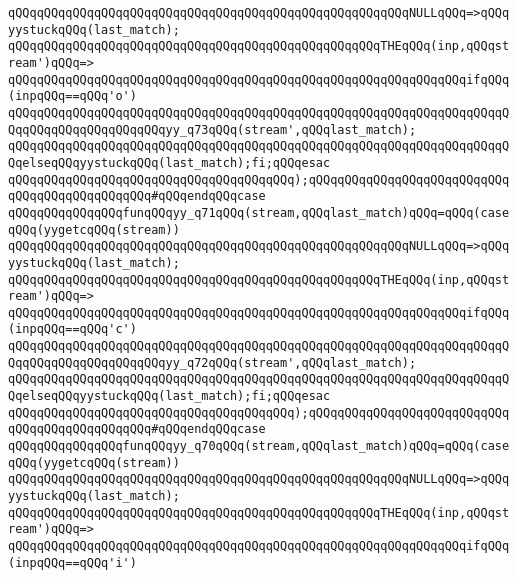 \verb|qQQqqQQqqQQqqQQqqQQqqQQqqQQqqQQqqQQqqQQqqQQqqQQqqQQqqQQqNULLqQQq=>qQQqyystuckqQQq(last_match);|\newline
\verb|qQQqqQQqqQQqqQQqqQQqqQQqqQQqqQQqqQQqqQQqqQQqqQQqqQQqTHEqQQq(inp,qQQqstream')qQQq=>|\newline
\verb|qQQqqQQqqQQqqQQqqQQqqQQqqQQqqQQqqQQqqQQqqQQqqQQqqQQqqQQqqQQqqQQqifqQQq(inpqQQq==qQQq'o')|\newline
\verb|qQQqqQQqqQQqqQQqqQQqqQQqqQQqqQQqqQQqqQQqqQQqqQQqqQQqqQQqqQQqqQQqqQQqqQQqqQQqqQQqqQQqqQQqqQQqyy_q73qQQq(stream',qQQqlast_match);|\newline
\verb|qQQqqQQqqQQqqQQqqQQqqQQqqQQqqQQqqQQqqQQqqQQqqQQqqQQqqQQqqQQqqQQqqQQqqQQqelseqQQqyystuckqQQq(last_match);fi;qQQqesac|\newline
\verb|qQQqqQQqqQQqqQQqqQQqqQQqqQQqqQQqqQQqqQQq);qQQqqQQqqQQqqQQqqQQqqQQqqQQqqQQqqQQqqQQqqQQqqQQq#qQQqendqQQqcase|\newline
\verb|qQQqqQQqqQQqqQQqfunqQQqyy_q71qQQq(stream,qQQqlast_match)qQQq=qQQq(caseqQQq(yygetcqQQq(stream))|\newline
\verb|qQQqqQQqqQQqqQQqqQQqqQQqqQQqqQQqqQQqqQQqqQQqqQQqqQQqqQQqNULLqQQq=>qQQqyystuckqQQq(last_match);|\newline
\verb|qQQqqQQqqQQqqQQqqQQqqQQqqQQqqQQqqQQqqQQqqQQqqQQqqQQqTHEqQQq(inp,qQQqstream')qQQq=>|\newline
\verb|qQQqqQQqqQQqqQQqqQQqqQQqqQQqqQQqqQQqqQQqqQQqqQQqqQQqqQQqqQQqqQQqifqQQq(inpqQQq==qQQq'c')|\newline
\verb|qQQqqQQqqQQqqQQqqQQqqQQqqQQqqQQqqQQqqQQqqQQqqQQqqQQqqQQqqQQqqQQqqQQqqQQqqQQqqQQqqQQqqQQqqQQqyy_q72qQQq(stream',qQQqlast_match);|\newline
\verb|qQQqqQQqqQQqqQQqqQQqqQQqqQQqqQQqqQQqqQQqqQQqqQQqqQQqqQQqqQQqqQQqqQQqqQQqelseqQQqyystuckqQQq(last_match);fi;qQQqesac|\newline
\verb|qQQqqQQqqQQqqQQqqQQqqQQqqQQqqQQqqQQqqQQq);qQQqqQQqqQQqqQQqqQQqqQQqqQQqqQQqqQQqqQQqqQQqqQQq#qQQqendqQQqcase|\newline
\verb|qQQqqQQqqQQqqQQqfunqQQqyy_q70qQQq(stream,qQQqlast_match)qQQq=qQQq(caseqQQq(yygetcqQQq(stream))|\newline
\verb|qQQqqQQqqQQqqQQqqQQqqQQqqQQqqQQqqQQqqQQqqQQqqQQqqQQqqQQqNULLqQQq=>qQQqyystuckqQQq(last_match);|\newline
\verb|qQQqqQQqqQQqqQQqqQQqqQQqqQQqqQQqqQQqqQQqqQQqqQQqqQQqTHEqQQq(inp,qQQqstream')qQQq=>|\newline
\verb|qQQqqQQqqQQqqQQqqQQqqQQqqQQqqQQqqQQqqQQqqQQqqQQqqQQqqQQqqQQqqQQqifqQQq(inpqQQq==qQQq'i')|\newline
